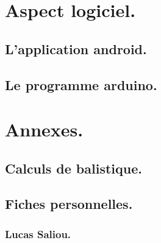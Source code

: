 \documentclass{report}
\begin{document}
\part{Aspect logiciel.}
\chapter{L'application android.} \label{andro}
% 

\chapter{Le programme arduino.} \label{ardui}
% 

\part{Annexes.}
\appendix

\chapter{Calculs de balistique.} \label{balis}
% 

\chapter{Fiches personnelles.}
\section{Lucas Saliou.}


\newpage
\listoffigures
{}
\end{document}
